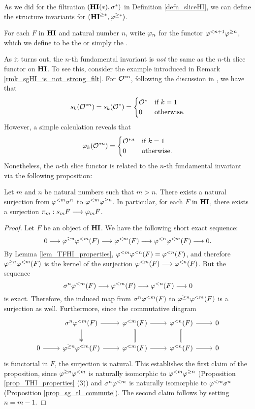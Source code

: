 As we did for the filtration $(\mathbf{HI}(*), \sigma^{*})$ in Definition
\ref{defn_sliceHI}, we can define the structure invariants for
$(\mathbf{HI}^{\geq *}, \varphi^{\geq *})$.
\begin{defn}
For each $F$ in $\mathbf{HI}$ and natural number $n$, write $\varphi_{n}$ 
for the functor $\varphi^{< n + 1} \varphi^{\geq n}$, which we define to be the 
or simply the .
\end{defn}

As it turns out, the $n$-th fundamental invariant is \emph{not} 
the same as the $n$-th slice functor on $\mathbf{HI}$. To see this, 
consider the example introduced in Remark 
\ref{rmk_sgHI_is_not_strong_filt}. For $\mathcal{O}^{* n}$, following the
discussion in \loccit, we have that
\[
s_k(\mathcal{O}^{* n}) = s_k(\mathcal{O}^*) = \begin{cases}
\mathcal{O}^* &\textrm{if }k = 1\\
0   &\textrm{otherwise}.
\end{cases}
\]
However, a simple calculation reveals that
\[
\varphi_{k}(\mathcal{O}^{* n}) = \begin{cases}
\mathcal{O}^{* n} &\textrm{if }k = 1\\
0     &\textrm{otherwise}.
\end{cases}
\]
Nonetheless, the $n$-th slice functor is related to the $n$-th
fundamental invariant via the following proposition:

\begin{prop}\label{prop_struct_consts}
Let $m$ and $n$ be natural numbers such that $m > n$. There exists 
a natural surjection from $\varphi^{< m} \sigma^{n}$ to $\varphi^{< m} 
\varphi^{\geq n}$. In particular, for each $F$ in $\mathbf{HI}$, there exists a 
surjection $\pi_m: s_m F \longrightarrow \varphi_{m} F$.
\end{prop}
\begin{proof}
Let $F$ be an object of $\mathbf{HI}$. We have the following short exact
sequence:
\[
0 \longrightarrow \varphi^{\geq n} \varphi^{< m}(F) \longrightarrow \varphi^{< m}(F) \longrightarrow 
  \varphi^{< n} \varphi^{< m}(F) \longrightarrow 0.
\]
By Lemma \ref{lem_TFHI_properties}, $\varphi^{< m} \varphi^{< n}(F) 
= \varphi^{< n}(F)$, and therefore $\varphi^{\geq n} \varphi^{< m}(F)$ is the kernel 
of the surjection $\varphi^{< m}(F) \longrightarrow \varphi^{< n}(F)$. But the sequence
\[
\sigma^{n} \varphi^{< m}(F) \longrightarrow \varphi^{< m}(F) \longrightarrow \varphi^{< n}(F) \longrightarrow 0
\]
is exact. Therefore, the induced map from $\sigma^{n} \varphi^{< m}(F)$
to $\varphi^{\geq n} \varphi^{< m}(F)$ is a surjection as well. Furthermore,
since the commutative diagram
\[
\begin{tikzcd}
{} & \sgHI{n} \tlHI{m}(F) \arrow{r} \arrow[twoheadrightarrow]{d} &
\tlHI{m}(F) \arrow{r} \arrow[equal]{d} &
\tlHI{n}(F) \arrow{r} \arrow[equal]{d} &
0 \\
0 \arrow{r} &
\tgHI{n} \tlHI{m}(F) \arrow{r} &
\tlHI{m}(F) \arrow{r} &
\tlHI{n}(F) \arrow{r} &
0
\end{tikzcd}
\] 
is functorial in $F$, the surjection is natural. This establishes the
first claim of the proposition, since $\varphi^{\geq n} \varphi^{< m}$ is naturally
isomorphic to $\varphi^{< m} \varphi^{\geq n}$ (Proposition
\ref{prop_THI_properties} (3)) and $\sigma^{n} \varphi^{< m}$ is naturally
isomorphic to $\varphi^{< m} \sigma^{n}$ (Proposition
\ref{prop_sg_tl_commute}). The second claim follows by setting $n = m
- 1$.
\end{proof}
